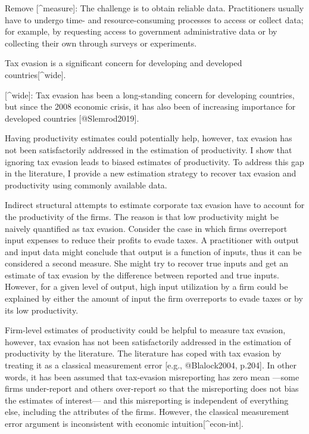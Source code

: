 \documentclass[
  12pt]{article}
\theoremstyle{definition}
\theoremstyle{remark}
\begin{document}
\begin{anfxnote*}{Remove}
[^measure]: The challenge is to obtain reliable data. Practitioners usually have to undergo time- and resource-consuming processes to access or collect data; for example, by requesting access to government administrative data or by collecting their own through surveys or experiments.

Tax evasion is a significant concern for developing and developed countries[^wide]. 

[^wide]: Tax evasion has been a long-standing concern for developing countries, but since the 2008 economic crisis, it has also been of increasing importance for developed countries [@Slemrod2019].


Having productivity estimates could potentially help, however, tax evasion has not been satisfactorily addressed in the estimation of productivity. I show that ignoring tax evasion leads to biased estimates of productivity. To address this gap in the literature, I provide a new estimation strategy to recover tax evasion and productivity using commonly available data. 

Indirect structural attempts to estimate corporate tax evasion have to account for the productivity of the firms. The reason is that low productivity might be naively quantified as tax evasion. Consider the case in which firms overreport input expenses to reduce their profits to evade taxes. A practitioner with output and input data might conclude that output is a function of inputs, thus it can be considered a second measure. She might try to recover true inputs and get an estimate of tax evasion by the difference between reported and true inputs. However, for a given level of output, high input utilization by a firm could be explained by either the amount of input the firm overreports to evade taxes or by its low productivity.

Firm-level estimates of productivity could be helpful to measure tax evasion, however, tax evasion has not been satisfactorily addressed in the estimation of productivity by the literature. The literature has coped with tax evasion by treating it as a classical measurement error [e.g., @Blalock2004, p.204]. In other words, it has been assumed that tax-evasion misreporting has zero mean —some firms under-report and others over-report so that the misreporting does not bias the estimates of interest— and this misreporting is independent of everything else, including the attributes of the firms. However, the classical measurement error argument is inconsistent with economic intuition[^econ-int]. 


\end{anfxnote*}
\end{document}

